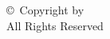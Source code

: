 \newpage
\thispagestyle{empty}   %
\addtocounter{page}{-1}
\chapter*{}  %
\begin{center}
    \vfill
    \large
    \copyright\ Copyright by \myname \ \thesisyear \\
    All Rights Reserved
\end{center}
\newpage
